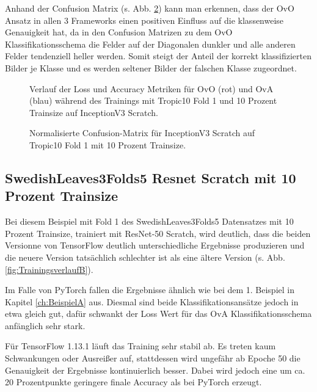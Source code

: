 Anhand der Confusion Matrix (s. Abb. \ref{fig:ConfusionMatrixA}) kann man erkennen, dass der OvO Ansatz in allen 3 Frameworks einen positiven Einfluss auf die klassenweise Genauigkeit hat, da in den Confusion Matrizen zu dem OvO Klassifikationsschema die Felder auf der Diagonalen dunkler und alle anderen Felder tendenziell heller werden. Somit steigt der Anteil der korrekt klassifizierten Bilder je Klasse und es werden seltener Bilder der falschen Klasse zugeordnet.
\begin{figure}[H]
\begin{adjustbox}{width=1.4\textwidth, center}

\end{adjustbox}
\caption{Verlauf der Loss und Accuracy Metriken für OvO (rot) und OvA (blau) während des Trainings mit Tropic10 Fold 1 und 10 Prozent Trainsize auf InceptionV3 Scratch.}
\label{fig:TrainingsverlaufA}
\end{figure}

\begin{figure}[H]
\begin{adjustbox}{width=1.1\textwidth, center}

\end{adjustbox}
\caption{Normalisierte Confusion-Matrix für InceptionV3 Scratch auf Tropic10 Fold 1 mit 10 Prozent Trainsize.}
\label{fig:ConfusionMatrixA}
\end{figure}

\subsection{SwedishLeaves3Folds5 Resnet Scratch mit 10 Prozent Trainsize}
\label{ch:BeispielB}
Bei diesem Beispiel mit Fold 1 des SwedishLeaves3Folds5 Datensatzes mit 10 Prozent Trainsize, trainiert mit ResNet-50 Scratch, wird deutlich, dass die beiden Versionne von TensorFlow \cite{tensorflow} deutlich unterschiedliche Ergebnisse produzieren und die neuere Version tatsächlich schlechter ist als eine ältere Version (s. Abb. \ref{fig:TrainingsverlaufB}).

Im Falle von PyTorch \cite{pytorch} fallen die Ergebnisse ähnlich wie bei dem 1. Beispiel in Kapitel \ref{ch:BeispielA} aus. Diesmal sind beide Klassifikationsansätze jedoch in etwa gleich gut, dafür schwankt der Loss Wert für das OvA Klassifikationsschema anfänglich sehr stark.

Für TensorFlow \cite{tensorflow} 1.13.1 läuft das Training sehr stabil ab. Es treten kaum Schwankungen oder Ausreißer auf, stattdessen wird ungefähr ab Epoche 50 die Genauigkeit der Ergebnisse kontinuierlich besser. Dabei wird jedoch eine um ca. 20 Prozentpunkte geringere finale Accuracy als bei PyTorch \cite{pytorch} erzeugt.

